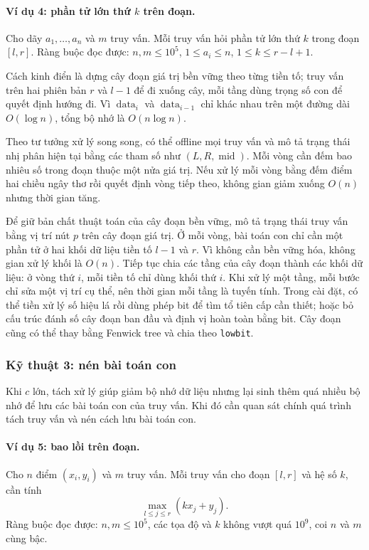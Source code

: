 \documentclass[11pt]{article}
\begin{document}
\paragraph{Ví dụ 4: phần tử lớn thứ $k$ trên đoạn.}
Cho dãy $a_1,\ldots,a_n$ và $m$ truy vấn. Mỗi truy vấn hỏi phần tử lớn thứ $k$
trong đoạn $[l,r]$. Ràng buộc đọc được: $n,m\le 10^5$,
$1\le a_i\le n$, $1\le k\le r-l+1$.

Cách kinh điển là dựng cây đoạn giá trị bền vững theo từng tiền tố; truy vấn
trên hai phiên bản $r$ và $l-1$ để đi xuống cây, mỗi tầng dùng trọng số con để
quyết định hướng đi. Vì $\operatorname{data}_i$ và
$\operatorname{data}_{i-1}$ chỉ khác nhau trên một đường dài $O(\log n)$, tổng
bộ nhớ là $O(n\log n)$.

Theo tư tưởng xử lý song song, có thể offline mọi truy vấn và mô tả trạng thái
nhị phân hiện tại bằng các tham số như $(L,R,\operatorname{mid})$. Mỗi vòng
cần đếm bao nhiêu số trong đoạn thuộc một nửa giá trị. Nếu xử lý mỗi vòng bằng
đếm điểm hai chiều ngây thơ rồi quyết định vòng tiếp theo, không gian giảm
xuống $O(n)$ nhưng thời gian tăng.

Để giữ bản chất thuật toán của cây đoạn bền vững, mô tả trạng thái truy vấn
bằng vị trí nút $p$ trên cây đoạn giá trị. Ở mỗi vòng, bài toán con chỉ cần
một phần tử ở hai khối dữ liệu tiền tố $l-1$ và $r$. Vì không cần bền vững hóa,
không gian xử lý khối là $O(n)$. Tiếp tục chia các tầng của cây đoạn thành các
khối dữ liệu: ở vòng thứ $i$, mỗi tiền tố chỉ dùng khối thứ $i$. Khi xử lý một
tầng, mỗi bước chỉ sửa một vị trí cụ thể, nên thời gian mỗi tầng là tuyến tính.
Trong cài đặt, có thể tiền xử lý số hiệu lá rồi dùng phép bit để tìm tổ tiên
cấp cần thiết; hoặc bỏ cấu trúc đánh số cây đoạn ban đầu và định vị hoàn toàn
bằng bit. Cây đoạn cũng có thể thay bằng Fenwick tree và chia theo
\texttt{lowbit}.

\subsubsection{Kỹ thuật 3: nén bài toán con}

Khi $c$ lớn, tách xử lý giúp giảm bộ nhớ dữ liệu nhưng lại sinh thêm quá nhiều
bộ nhớ để lưu các bài toán con của truy vấn. Khi đó cần quan sát chính quá
trình tách truy vấn và nén cách lưu bài toán con.

\paragraph{Ví dụ 5: bao lồi trên đoạn.}
Cho $n$ điểm $(x_i,y_i)$ và $m$ truy vấn. Mỗi truy vấn cho đoạn $[l,r]$ và hệ
số $k$, cần tính
\[
  \max_{l\le j\le r} (k x_j+y_j).
\]
Ràng buộc đọc được: $n,m\le 10^5$, các tọa độ và $k$ không vượt quá $10^9$,
coi $n$ và $m$ cùng bậc.
\end{document}

